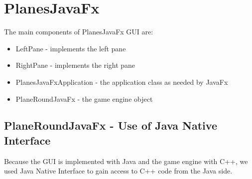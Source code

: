 \section {PlanesJavaFx}

The main components of PlanesJavaFx GUI are:

\begin{itemize}
	\item LeftPane - implements the left pane
	\item RightPane - implements the right pane
	\item PlanesJavaFxApplication  - the application class as needed by JavaFx
	\item PlaneRoundJavaFx - the game engine object
\end{itemize}


\subsection {PlaneRoundJavaFx - Use of Java Native Interface}

Because the GUI is implemented with Java and the game engine with C++, we used Java Native Interface to gain access to C++ code from the Java side. 

